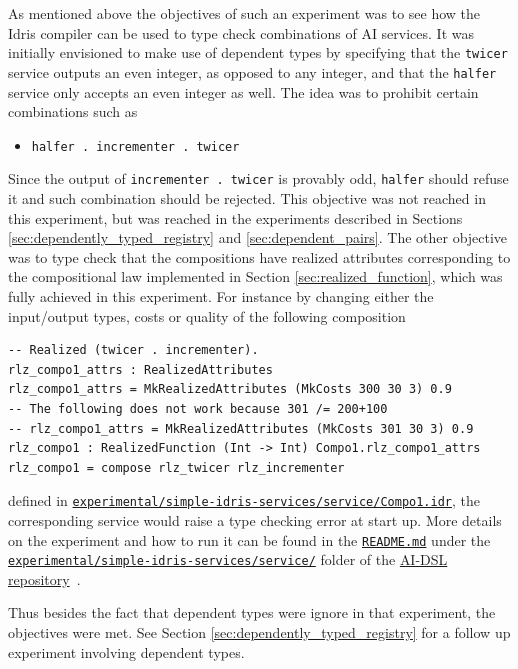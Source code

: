 \documentclass[]{report}
\begin{document}
As mentioned above the objectives of such an experiment was to see how
the Idris compiler can be used to type check combinations of AI
services.  It was initially envisioned to make use of dependent types
by specifying that the \texttt{twicer} service outputs an even
integer, as opposed to any integer, and that the \texttt{halfer}
service only accepts an even integer as well.  The idea was to
prohibit certain combinations such as
\begin{itemize}
\item \texttt{halfer . incrementer . twicer}
\end{itemize}
Since the output of \texttt{incrementer . twicer} is provably odd,
\texttt{halfer} should refuse it and such combination should be
rejected.  This objective was not reached in this experiment, but was
reached in the experiments described in Sections
\ref{sec:dependently_typed_registry} and \ref{sec:dependent_pairs}.
The other objective was to type check that the compositions have
realized attributes corresponding to the compositional law implemented
in Section \ref{sec:realized_function}, which was fully achieved in
this experiment.  For instance by changing either the input/output
types, costs or quality of the following composition
\begin{verbatim}
-- Realized (twicer . incrementer).
rlz_compo1_attrs : RealizedAttributes
rlz_compo1_attrs = MkRealizedAttributes (MkCosts 300 30 3) 0.9
-- The following does not work because 301 /= 200+100
-- rlz_compo1_attrs = MkRealizedAttributes (MkCosts 301 30 3) 0.9
rlz_compo1 : RealizedFunction (Int -> Int) Compo1.rlz_compo1_attrs
rlz_compo1 = compose rlz_twicer rlz_incrementer
\end{verbatim}
defined in
\href{https://github.com/singnet/ai-dsl/blob/master/experimental/simple-idris-services/service/Compo1.idr}{\texttt{experimental/simple-idris-services/service/Compo1.idr}},
the corresponding service would raise a type checking error at start
up.  More details on the experiment and how to run it can be found in
the
\href{https://github.com/singnet/ai-dsl/blob/master/experimental/simple-idris-services/README.md}{\texttt{README.md}}
under the
\href{https://github.com/singnet/ai-dsl/blob/master/experimental/simple-idris-services/}{\texttt{experimental/simple-idris-services/service/}}
folder of the \href{https://github.com/singnet/ai-dsl/}{AI-DSL
  repository}~\cite{AIDSLRepo}.

Thus besides the fact that dependent types were ignore in that
experiment, the objectives were met.  See Section \ref{sec:dependently_typed_registry}
for a follow up experiment involving dependent types.
\end{document}
